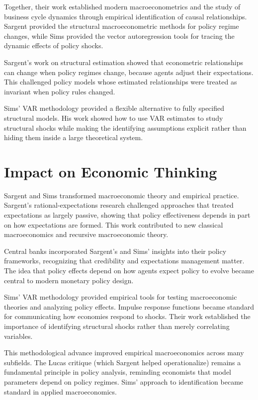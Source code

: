 Together, their work established modern macroeconometrics and the study of
business cycle dynamics through empirical identification of causal relationships.
Sargent provided the structural macroeconometric methods for policy regime changes,
while Sims provided the vector autoregression tools for tracing the dynamic
effects of policy shocks.

Sargent's work on structural estimation showed that econometric relationships can
change when policy regimes change, because agents adjust their expectations. This
challenged policy models whose estimated relationships were treated as invariant
when policy rules changed.

Sims' VAR methodology provided a flexible alternative to fully specified
structural models. His work showed how to use VAR estimates to study structural
shocks while making the identifying assumptions explicit rather than hiding them
inside a large theoretical system.

\section{Impact on Economic Thinking}
Sargent and Sims transformed macroeconomic theory and empirical practice. Sargent's
rational-expectations research challenged approaches that treated expectations as
largely passive, showing that policy effectiveness depends in part on how
expectations are formed. This work contributed to new classical macroeconomics and
recursive macroeconomic theory.

Central banks incorporated Sargent's and Sims' insights into their policy frameworks,
recognizing that credibility and expectations management matter. The idea that
policy effects depend on how agents expect policy to evolve became central to
modern monetary policy design.

Sims' VAR methodology provided empirical tools for testing macroeconomic theories
and analyzing policy effects. Impulse response functions became standard for
communicating how economies respond to shocks. Their work established the
importance of identifying structural shocks rather than merely correlating
variables.

This methodological advance improved empirical macroeconomics across many
subfields. The Lucas critique (which Sargent helped operationalize) remains a
fundamental principle in policy analysis, reminding economists that model parameters
depend on policy regimes. Sims' approach to identification became standard in
applied macroeconomics.

